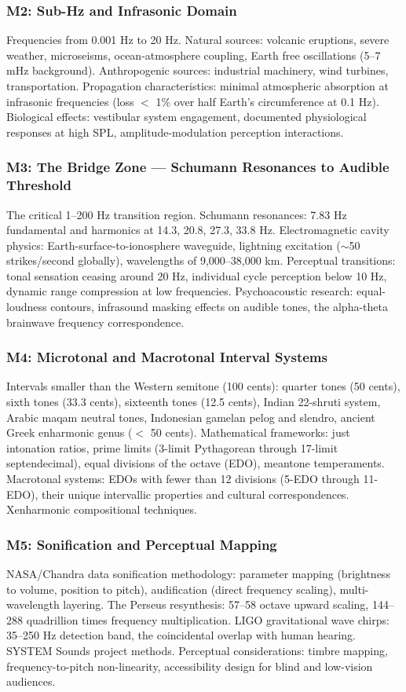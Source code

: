 \documentclass[11pt,letterpaper]{article}
\begin{document}
\subsubsection{M2: Sub-Hz and Infrasonic Domain}
Frequencies from 0.001 Hz to 20 Hz. Natural sources: volcanic eruptions, severe weather, microseisms, ocean-atmosphere coupling, Earth free oscillations (5--7 mHz background). Anthropogenic sources: industrial machinery, wind turbines, transportation. Propagation characteristics: minimal atmospheric absorption at infrasonic frequencies (loss $<$ 1\% over half Earth's circumference at 0.1 Hz). Biological effects: vestibular system engagement, documented physiological responses at high SPL, amplitude-modulation perception interactions.

\subsubsection{M3: The Bridge Zone --- Schumann Resonances to Audible Threshold}
The critical 1--200 Hz transition region. Schumann resonances: 7.83 Hz fundamental and harmonics at 14.3, 20.8, 27.3, 33.8 Hz. Electromagnetic cavity physics: Earth-surface-to-ionosphere waveguide, lightning excitation ($\sim$50 strikes/second globally), wavelengths of 9,000--38,000 km. Perceptual transitions: tonal sensation ceasing around 20 Hz, individual cycle perception below 10 Hz, dynamic range compression at low frequencies. Psychoacoustic research: equal-loudness contours, infrasound masking effects on audible tones, the alpha-theta brainwave frequency correspondence.

\subsubsection{M4: Microtonal and Macrotonal Interval Systems}
Intervals smaller than the Western semitone (100 cents): quarter tones (50 cents), sixth tones (33.3 cents), sixteenth tones (12.5 cents), Indian 22-shruti system, Arabic maqam neutral tones, Indonesian gamelan pelog and slendro, ancient Greek enharmonic genus ($<$ 50 cents). Mathematical frameworks: just intonation ratios, prime limits (3-limit Pythagorean through 17-limit septendecimal), equal divisions of the octave (EDO), meantone temperaments. Macrotonal systems: EDOs with fewer than 12 divisions (5-EDO through 11-EDO), their unique intervallic properties and cultural correspondences. Xenharmonic compositional techniques.

\subsubsection{M5: Sonification and Perceptual Mapping}
NASA/Chandra data sonification methodology: parameter mapping (brightness to volume, position to pitch), audification (direct frequency scaling), multi-wavelength layering. The Perseus resynthesis: 57--58 octave upward scaling, 144--288 quadrillion times frequency multiplication. LIGO gravitational wave chirps: 35--250 Hz detection band, the coincidental overlap with human hearing. SYSTEM Sounds project methods. Perceptual considerations: timbre mapping, frequency-to-pitch non-linearity, accessibility design for blind and low-vision audiences.
\end{document}
